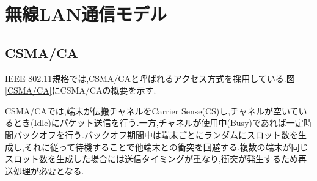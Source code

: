 \documentclass[a4paper, 10pt]{ltjsarticle}
\begin{document}
\section{無線LAN通信モデル}


\subsection{CSMA/CA}

IEEE 802.11規格では,CSMA/CAと呼ばれるアクセス方式を採用している.図\ref{CSMA/CA}にCSMA/CAの概要を示す.


CSMA/CAでは,端末が伝搬チャネルをCarrier Sense(CS)し,チャネルが空いているとき(Idle)にパケット送信を行う.一方,チャネルが使用中(Busy)であれば一定時間バックオフを行う.バックオフ期間中は端末ごとにランダムにスロット数を生成し,それに従って待機することで他端末との衝突を回避する.複数の端末が同じスロット数を生成した場合には送信タイミングが重なり,衝突が発生するため再送処理が必要となる.
\end{document}
